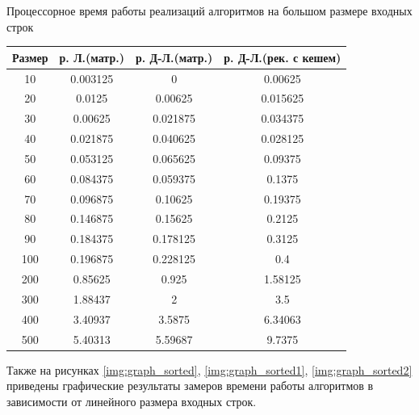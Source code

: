 \begin{center}
	\begin{threeparttable}
		\caption{Процессорное время работы реализаций алгоритмов на большом размере входных строк}
		\label{tbl:best1}
		\begin{tabular}{|c|c|c|c|}
			\hline
			Размер &р. Л.(матр.) &р. Д-Л.(матр.)  &р. Д-Л.(рек. с кешем)\\
			\hline
		 	10  &     0.003125     &         0   &     0.00625 \\
			\hline
			 20   &      0.0125   &     0.00625   &    0.015625 \\
			\hline
			30   &     0.00625   &    0.021875    &   0.034375  \\
			\hline
			40   &    0.021875  &     0.040625    &   0.028125\\
			\hline
			50    &   0.053125  &     0.065625   &     0.09375\\
			\hline
		 	60   &    0.084375  &     0.059375   &      0.1375\\
			\hline
			70    &   0.096875   &     0.10625    &    0.19375 \\
			\hline
			80    &   0.146875    &    0.15625    &     0.2125\\
			\hline
			 90   &    0.184375   &    0.178125   &      0.3125\\
			\hline
			100    &   0.196875   &    0.228125   &         0.4\\
			\hline
			200   &     0.85625    &      0.925   &     1.58125\\
			\hline
			300   &     1.88437    &          2   &         3.5\\
			\hline
			400    &    3.40937     &    3.5875   &     6.34063\\
			\hline
			500     &   5.40313     &   5.59687    &     9.7375\\
			\hline
		\end{tabular}
		
	\end{threeparttable}
\end{center}
Также на рисунках \ref{img:graph_sorted},  \ref{img:graph_sorted1}, \ref{img:graph_sorted2} приведены графические результаты замеров времени работы алгоритмов в зависимости от линейного размера входных строк.

